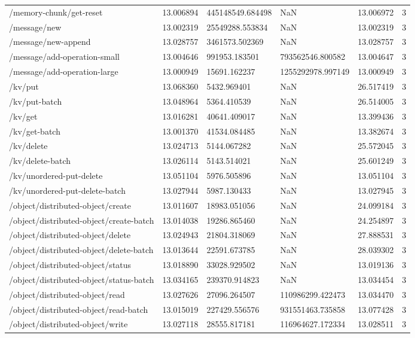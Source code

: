 \begin{tabularx}{\linewidth}{XXXXXX}
/memory-chunk/get-reset & 13.006894 & 445148549.684498 & NaN & 13.006972 & 3 \\
/message/new & 13.002319 & 25549288.553834 & NaN & 13.002319 & 3 \\
/message/new-append & 13.028757 & 3461573.502369 & NaN & 13.028757 & 3 \\
/message/add-operation-small & 13.004646 & 991953.183501 & 793562546.800582 & 13.004647 & 3 \\
/message/add-operation-large & 13.000949 & 15691.162237 & 1255292978.997149 & 13.000949 & 3 \\
/kv/put & 13.068360 & 5432.969401 & NaN & 26.517419 & 3 \\
/kv/put-batch & 13.048964 & 5364.410539 & NaN & 26.514005 & 3 \\
/kv/get & 13.016281 & 40641.409017 & NaN & 13.399436 & 3 \\
/kv/get-batch & 13.001370 & 41534.084485 & NaN & 13.382674 & 3 \\
/kv/delete & 13.024713 & 5144.067282 & NaN & 25.572045 & 3 \\
/kv/delete-batch & 13.026114 & 5143.514021 & NaN & 25.601249 & 3 \\
/kv/unordered-put-delete & 13.051104 & 5976.505896 & NaN & 13.051104 & 3 \\
/kv/unordered-put-delete-batch & 13.027944 & 5987.130433 & NaN & 13.027945 & 3 \\
/object/distributed-object/create & 13.011607 & 18983.051056 & NaN & 24.099184 & 3 \\
/object/distributed-object/create-batch & 13.014038 & 19286.865460 & NaN & 24.254897 & 3 \\
/object/distributed-object/delete & 13.024943 & 21804.318069 & NaN & 27.888531 & 3 \\
/object/distributed-object/delete-batch & 13.013644 & 22591.673785 & NaN & 28.039302 & 3 \\
/object/distributed-object/status & 13.018890 & 33028.929502 & NaN & 13.019136 & 3 \\
/object/distributed-object/status-batch & 13.034165 & 239370.914823 & NaN & 13.034454 & 3 \\
/object/distributed-object/read & 13.027626 & 27096.264507 & 110986299.422473 & 13.034470 & 3 \\
/object/distributed-object/read-batch & 13.015019 & 227429.556576 & 931551463.735858 & 13.077428 & 3 \\
/object/distributed-object/write & 13.027118 & 28555.817181 & 116964627.172334 & 13.028511 & 3 \\

\end{tabularx}
